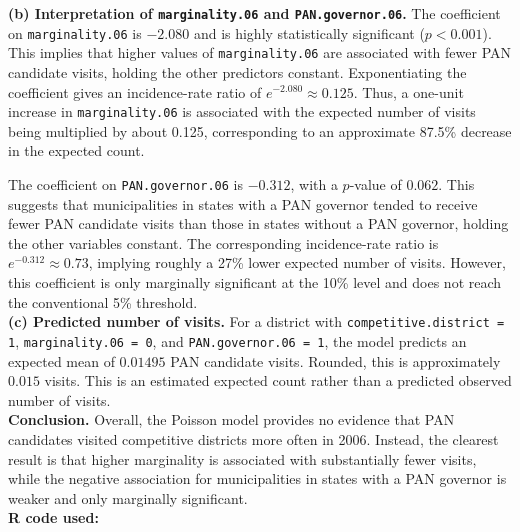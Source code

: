 \documentclass[12pt,letterpaper]{article}
\begin{document}
\noindent \textbf{(b) Interpretation of \texttt{marginality.06} and \texttt{PAN.governor.06}.}
The coefficient on \texttt{marginality.06} is \(-2.080\) and is highly statistically significant (\(p < 0.001\)). This implies that higher values of \texttt{marginality.06} are associated with fewer PAN candidate visits, holding the other predictors constant. Exponentiating the coefficient gives an incidence-rate ratio of \(e^{-2.080} \approx 0.125\). Thus, a one-unit increase in \texttt{marginality.06} is associated with the expected number of visits being multiplied by about 0.125, corresponding to an approximate 87.5\% decrease in the expected count.

\noindent The coefficient on \texttt{PAN.governor.06} is \(-0.312\), with a \(p\)-value of \(0.062\). This suggests that municipalities in states with a PAN governor tended to receive fewer PAN candidate visits than those in states without a PAN governor, holding the other variables constant. The corresponding incidence-rate ratio is \(e^{-0.312} \approx 0.73\), implying roughly a 27\% lower expected number of visits. However, this coefficient is only marginally significant at the 10\% level and does not reach the conventional 5\% threshold.\\

\noindent \textbf{(c) Predicted number of visits.}
For a district with \texttt{competitive.district = 1}, \texttt{marginality.06 = 0}, and \texttt{PAN.governor.06 = 1}, the model predicts an expected mean of \(0.01495\) PAN candidate visits. Rounded, this is approximately \(0.015\) visits. This is an estimated expected count rather than a predicted observed number of visits.\\

\noindent \textbf{Conclusion.}
Overall, the Poisson model provides no evidence that PAN candidates visited competitive districts more often in 2006. Instead, the clearest result is that higher marginality is associated with substantially fewer visits, while the negative association for municipalities in states with a PAN governor is weaker and only marginally significant.\\

\noindent\textbf{R code used:}


\end{document}

